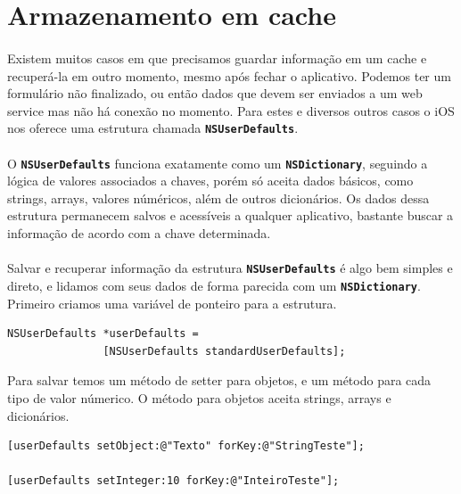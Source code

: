 \documentclass[a4paper,12pt,brazil,doubleside]{book}
\begin{document}
\bigskip


\section{Armazenamento em cache}

\paragraph{}Existem muitos casos em que precisamos guardar informação em um cache e recuperá-la em outro momento, mesmo após fechar o aplicativo. Podemos ter um formulário não finalizado, ou então dados que devem ser enviados a um web service mas não há conexão no momento. Para estes e diversos outros casos o iOS nos oferece uma estrutura chamada \texttt{\textbf{NSUserDefaults}}.
\paragraph{}O \texttt{\textbf{NSUserDefaults}} funciona exatamente como um \texttt{\textbf{NSDictionary}}, seguindo a lógica de valores associados a chaves, porém só aceita dados básicos, como strings, arrays, valores núméricos, além de outros dicionários. Os dados dessa estrutura permanecem salvos e acessíveis a qualquer aplicativo, bastante buscar a informação de acordo com a chave determinada.
\paragraph{}Salvar e recuperar informação da estrutura \texttt{\textbf{NSUserDefaults}} é algo bem simples e direto, e lidamos com seus dados de forma parecida com um \texttt{\textbf{NSDictionary}}. Primeiro criamos uma variável de ponteiro para a estrutura.

\begin{listing}
\begin{verbatim}
NSUserDefaults *userDefaults =
               [NSUserDefaults standardUserDefaults];
\end{verbatim}
\end{listing}

Para salvar temos um método de setter para objetos, e um método para cada tipo de valor númerico. O método para objetos aceita strings, arrays e dicionários.

\begin{listing}
\begin{verbatim}
[userDefaults setObject:@"Texto" forKey:@"StringTeste"];

[userDefaults setInteger:10 forKey:@"InteiroTeste"];
\end{verbatim}
\end{listing}
\end{document}
